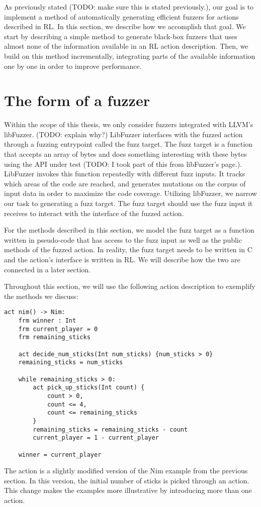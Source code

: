 As previously stated (TODO: make sure this is stated previously.), our goal is to implement a method of automatically generating
 efficient fuzzers for actions described in RL.
In this section, we describe how we accomplish that goal.
We start by describing a simple method to generate black-box fuzzers that uses almost none of the information available in an RL action description.
Then, we build on this method incrementally, integrating parts of the available information one by one in order to improve performance.

\section{The form of a fuzzer}
Within the scope of this thesis, we only consider fuzzers integrated with LLVM's libFuzzer. (TODO: explain why?)
LibFuzzer interfaces with the fuzzed action through a fuzzing entrypoint called the fuzz target.
The fuzz target is a function that accepts an array of bytes and does something interesting with these bytes using the API under test (TODO: I took part of this from libFuzzer's page.).
LibFuzzer invokes this function repeatedly with different fuzz inputs. It tracks which areas of the code are reached, and generates mutations on the corpus of input data in order to maximize the code coverage.
Utilizing libFuzzer, we narrow our task to generating a fuzz target.
The fuzz target should use the fuzz input it receives to interact with the interface of the fuzzed action.

For the methods described in this section, we model the fuzz target as a function written in pseudo-code that has access to the fuzz input as well
 as the public methods of the fuzzed action.
In reality, the fuzz target needs to be written in C and the action's interface is written in RL. We will describe how the two are connected in a later section.

Throughout this section, we will use the following action description to exemplify the methods we discuss:
\begin{lstlisting}
act nim() -> Nim:
    frm winner : Int
    frm current_player = 0
    frm remaining_sticks

    act decide_num_sticks(Int num_sticks) {num_sticks > 0}
    remaining_sticks = num_sticks

    while remaining_sticks > 0:
        act pick_up_sticks(Int count) {
            count > 0,
            count <= 4,
            count <= remaining_sticks
        }
        remaining_sticks = remaining_sticks - count
        current_player = 1 - current_player

    winner = current_player
\end{lstlisting}
The action is a slightly modified version of the Nim example from the previous section.
In this version, the initial number of sticks is picked through an action. This change makes the examples more illustrative by introducing more than one action.

